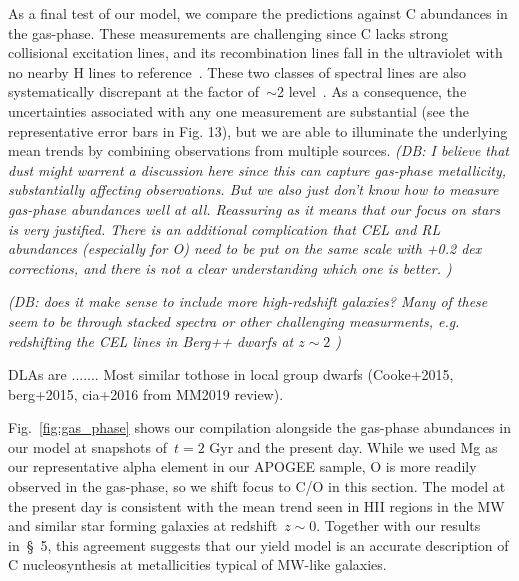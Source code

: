 \documentclass[fleqn,
usenatbib]{mnras}
\newcommand{\dbnote}[1]{ {\color{Thistle} \textit{\small (DB: #1)}} }
\begin{document}
As a final test of our model, we compare the predictions against C abundances
in the gas-phase.
These measurements are challenging since C lacks strong collisional excitation
lines, and its recombination lines fall in the ultraviolet with no nearby
H lines to reference~\citep[e.g.,][]{skillman+20}.
These two classes of spectral lines are also systematically discrepant at the
factor of~$\sim$2 level~\citep{GR07}.
As a consequence, the uncertainties associated with any one measurement are
substantial (see the representative error bars in Fig. 13), but we are able to
illuminate the underlying mean trends by combining observations from multiple
sources.
\dbnote{I believe that dust might warrent a discussion here since this can capture gas-phase metallicity, substantially affecting observations. But we also just don't know how to measure gas-phase abundances well at all. Reassuring as it means that our focus on stars is very justified.
There is an additional complication that CEL and RL abundances (especially for O) need to be put on the same scale with +0.2 dex corrections, and there is not a clear understanding which one is better.
\citet{MM19}
}

\dbnote{does it make sense to include more high-redshift galaxies? 
Many of these seem to be through stacked spectra or other challenging measurments, e.g. redshifting the CEL lines in Berg++ dwarfs at $z\sim 2$
}

DLAs are .......
Most similar tothose in local group dwarfs (Cooke+2015, berg+2015, cia+2016 from MM2019 review).


Fig.~\ref{fig:gas_phase} shows our compilation alongside the gas-phase abundances in our model
at snapshots of~$t = 2$ Gyr and the present day.
While we used Mg as our representative alpha element in our APOGEE sample, O
is more readily observed in the gas-phase, so we shift focus to C/O in this
section.
The model at the present day is consistent with the mean trend seen in HII
regions in the MW and similar star forming galaxies at redshift~$z \sim 0$.
Together with our results in~\S~5, this agreement suggests that our yield model
is an accurate description of C nucleosynthesis at metallicities typical of
MW-like galaxies.
\end{document}
